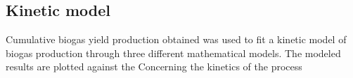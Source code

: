 \subsection{Kinetic model}
Cumulative biogas yield production obtained  was used to fit a kinetic model of biogas production through three different mathematical models. The modeled results are plotted against the
Concerning the kinetics of the process